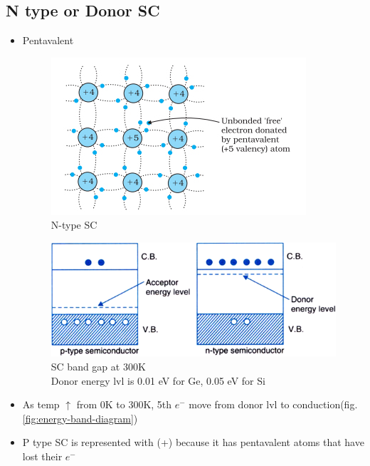 \documentclass[10pt, a4paper]{report}
\begin{document}
	\subsection{N type or Donor SC}
	\begin{itemize}
		\item Pentavalent
		\begin{figure}[h]
			\centering
			\includegraphics[width=0.7\linewidth]{img/Extrinsic-semiconductor-1}
			\caption{N-type SC}
			\label{fig:extrinsic-semiconductor}
		\end{figure}
		\begin{figure}[h]
			\centering
			\includegraphics[width=0.7\linewidth]{img/extrinsic_band_gap}
			\caption{SC band gap at 300K \\ Donor energy lvl is 0.01 eV for Ge, 0.05 eV for Si}
			\label{fig:extrinsic-band-gap}
		\end{figure}
		\item As temp $\uparrow$ from 0K to 300K, 5th $ e^- $ move from donor lvl to conduction(fig. \ref{fig:energy-band-diagram})
		\item P type SC is represented with (+) because it has pentavalent atoms that have lost their $ e^- $
	\end{itemize}
\end{document}
